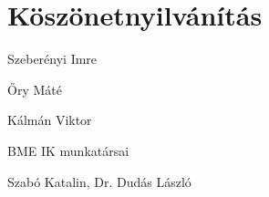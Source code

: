 \chapter*{Köszönetnyilvánítás}

Szeberényi Imre

Őry Máté

Kálmán Viktor

BME IK munkatársai

Szabó Katalin, Dr. Dudás László